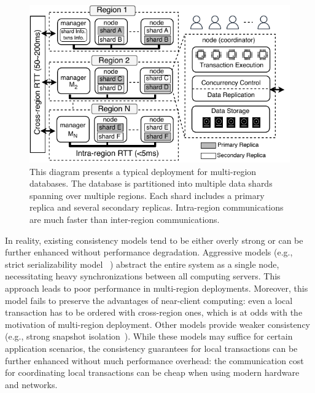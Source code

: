 \begin{figure}[t]  
\vspace{5pt}
  \centering
  \includegraphics[width=\columnwidth]{figures/deployment.pdf}
\vspace{-10pt}
  \caption{This diagram presents a typical deployment for multi-region databases. The database is partitioned into multiple data shards spanning over multiple regions. Each shard includes a primary replica and several secondary replicas. Intra-region communications are much faster than inter-region communications.}\label{fig:intro}
  \vspace{-10pt}
\end{figure}

In reality, existing consistency models tend to be either overly strong or can be further enhanced without performance degradation. Aggressive models (e.g., strict serializability model ~\cite{papadimitriou1979serializability}) abstract the entire system as a single node, necessitating heavy synchronizations between all computing servers. This approach leads to poor performance in multi-region deployments. Moreover, this model fails to preserve the advantages of near-client computing: even a local transaction has to be ordered with cross-region ones, which is at odds with the motivation of multi-region deployment. Other models provide weaker consistency (e.g., strong snapshot isolation~\cite{daudjee2006lazy}). While these models may suffice for certain application scenarios, the consistency guarantees for local transactions can be further enhanced without much performance overhead: the communication cost for coordinating local transactions can be cheap when using modern hardware and networks. 



